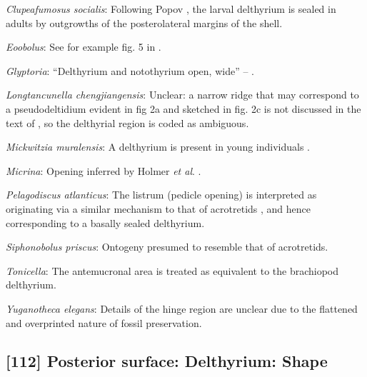 \documentclass[openany]{book}
\begin{document}
\hypertarget{Clupeafumosus_socialis-coding-111}{}
\emph{Clupeafumosus socialis}: Following Popov
\citeyearpar{Popov1992TheCambrian}, the larval delthyrium is sealed in
adults by outgrowths of the posterolateral margins of the shell.

\hypertarget{Eoobolus-coding-111}{}
\emph{Eoobolus}: See for example fig. 5 in
\citet{Balthasar2009Thebrachiopod}.

\hypertarget{Glyptoria-coding-111}{}
\emph{Glyptoria}: ``Delthyrium and notothyrium open, wide'' --
\citet{Cooper1976LowerCambrian}.

\hypertarget{Longtancunella_chengjiangensis-coding-111}{}
\emph{Longtancunella chengjiangensis}: Unclear: a narrow ridge that may
correspond to a pseudodeltidium evident in fig 2a and sketched in fig.
2c is not discussed in the text of \citet{Zhang2011Theexceptionally}, so
the delthyrial region is coded as ambiguous.

\hypertarget{Mickwitzia_muralensis-coding-111}{}
\emph{Mickwitzia muralensis}: A delthyrium is present in young
individuals \citep{Balthasar2004Shellstructure}.

\hypertarget{Micrina-coding-111}{}
\emph{Micrina}: Opening inferred by Holmer \emph{et al}.
\citeyearpar{Holmer2008TheEarly}.

\hypertarget{Pelagodiscus_atlanticus-coding-111}{}
\emph{Pelagodiscus atlanticus}: The listrum (pedicle opening) is
interpreted as originating via a similar mechanism to that of
acrotretids \citep{Popov1992TheCambrian}, and hence corresponding to a
basally sealed delthyrium.

\hypertarget{Siphonobolus_priscus-coding-111}{}
\emph{Siphonobolus priscus}: Ontogeny presumed to resemble that of
acrotretids.

\hypertarget{Tonicella-coding-111}{}
\emph{Tonicella}: The antemucronal area \citep{Schwabe2010} is treated
as equivalent to the brachiopod delthyrium.

\hypertarget{Yuganotheca_elegans-coding-111}{}
\emph{Yuganotheca elegans}: Details of the hinge region are unclear due
to the flattened and overprinted nature of fossil preservation.

\subsection*{{[}112{]} Posterior surface: Delthyrium:
Shape}\label{posterior-surface-delthyrium-shape}
\end{document}

